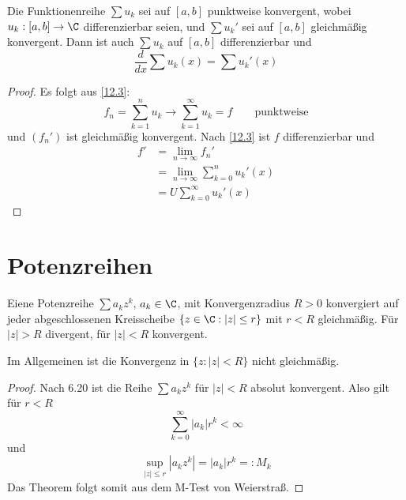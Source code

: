 \documentclass[a4paper,10pt]{scrbook}
\begin{document}
\setcounter{thm}{7}
\begin{st}
\label{12.8}
Die Funktionenreihe $\sum u_k$ sei auf $[a,b]$ punktweise konvergent, wobei
$u_k:[a,b]\to\C$ differenzierbar seien, und $\sum u_k'$ sei auf $[a,b]$ gleichmäßig konvergent.
Dann ist auch $\sum u_k$ auf $[a,b]$ differenzierbar und
\[
\frac d{dx}\sum u_k(x)=\sum u_k'(x)
\]
\begin{proof}
Es folgt aus \ref{12.3}:
\[
f_n=\sum_{k=1}^n u_k\longrightarrow \sum_{k=1}^\infty u_k=f \qquad \text{punktweise}
\]
und $(f_n')$ ist gleichmäßig konvergent.
Nach \ref{12.3} ist $f$ differenzierbar und
\begin{align*}
f'&=\lim_{n\to\infty} f_n' \\
&=\lim_{n\to\infty}\sum_{k=0}^n u_k'(x)\\
&=U\sum_{k=0}^\infty u_k'(x)
\end{align*}
\end{proof}
\end{st}

\section{Potenzreihen}

\begin{thm}
\label{12.9}
Eiene Potenzreihe $\sum a_kz^k$, $a_k\in\C$, mit Konvergenzradius $R>0$
konvergiert auf jeder abgeschlossenen Kreisscheibe $\{z\in\C:|z|\le r\}$ mit $r<R$ gleichmäßig.
Für $|z|>R$ divergent, für $|z|<R$ konvergent.
\begin{note}
Im Allgemeinen ist die Konvergenz in $\{z:|z|<R\}$ nicht gleichmäßig.
\end{note}
\begin{proof}
Nach 6.20 ist die Reihe $\sum a_kz^k$ für $|z|<R$ absolut konvergent.
Also gilt für $r<R$ 
\[
\sum_{k=0}^\infty |a_k|r^k < \infty
\]
und
\[
\sup_{|z|\le r}|a_kz^k| = |a_k|r^k =: M_k
\]
Das Theorem folgt somit aus dem M-Test von Weierstraß.
\end{proof}
\end{thm}
\end{document}
